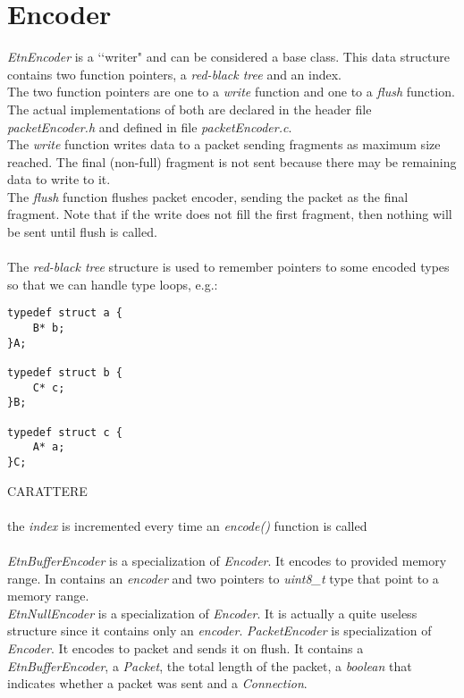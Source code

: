 

\section*{Encoder}
\emph{EtnEncoder} is a \lq\lq writer" and can be considered a base class. This data structure contains two function pointers, a \emph{red-black tree} and an index.\\
The two function pointers are one to a \emph{write} function and one to a \emph{flush} function. The actual implementations of both are declared in the header file \emph{packetEncoder.h} and defined in file \emph{packetEncoder.c}.\\
The \emph{write} function  writes data to a packet sending fragments as maximum size reached. The final (non-full) fragment is not sent because there may be remaining data to write to it.\\
The \emph{flush} function flushes packet encoder, sending the packet as the final fragment. Note that if the write does not fill the first fragment, then nothing will be sent until flush is called.\\\\
The \emph{red-black tree} structure is used to remember pointers to some encoded types so that we can handle type loops, e.g.:
\begin{lstlisting}
typedef struct a {
	B* b;
}A;

typedef struct b {
	C* c;
}B;

typedef struct c {
	A* a;
}C;
\end{lstlisting}
CARATTERE\\\\
the \emph{index} is incremented every time an \emph{encode()} function is called \\\\
\emph{EtnBufferEncoder} is a specialization of \emph{Encoder}. It encodes to provided memory range. In contains an \emph{encoder} and two pointers to \emph{uint8\_t} type that point to a memory range.\\
\emph{EtnNullEncoder} is a specialization of \emph{Encoder}. It is actually a quite useless structure since it contains only an \emph{encoder}.
\emph{PacketEncoder} is specialization of \emph{Encoder}. 
It encodes to packet and sends it on flush. It contains a \emph{EtnBufferEncoder}, a \emph{Packet}, the total length of the packet, a \emph{boolean} that indicates whether a packet was sent and a \emph{Connection}. 



















